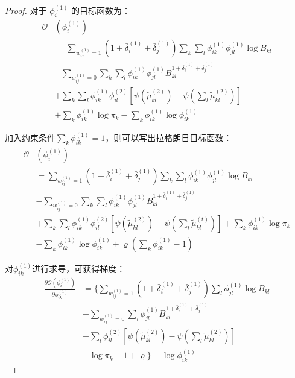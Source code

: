 \begin{proof}
	对于 $\phi_i^{(1)}$ 的目标函数为：
	\begin{equation}
		\begin{split}
			\mathscr{O}&(\phi_i^{(1)})  \\
			& = \sum_{w_{ij}^{(1)}=1} (1+\bar{\delta}_i^{(1)}+\bar{\delta}_j^{(1)}) \sum_k \sum_l \phi_{ik}^{(1)}\phi_{jl}^{(1)} \log B_{kl} \\
			& -\sum_{w_{ij}^{(1)}=0} \sum_k \sum_l \phi_{ik}^{(1)}\phi_{jl}^{(1)}  B_{kl}^{1+\bar{\delta}_i^{(1)}+\bar{\delta}_j^{(1)}}  \\
			& + \sum_k \sum_l \phi_{ik}^{(1)}\phi_{il}^{(2)} [\psi(\tilde{\mu}_{kl}^{(2)}) - \psi(\sum_l \tilde{\mu}_{kl}^{(2)})]  \\
			& + \sum_k \phi_{ik}^{(1)} \log \pi_k   - \sum_k \phi_{ik}^{(1)} \log \phi_{ik}^{(1)}
		\end{split}
	\end{equation}
	
	加入约束条件$\sum_k \phi_{ik}^{(1)} = 1$，则可以写出拉格朗日目标函数：
	\begin{equation}
		\begin{split}
			\mathscr{O}&(\phi_i^{(1)})  \\
			& = \sum_{w_{ij}^{(1)}=1} (1+\bar{\delta}_i^{(1)}+\bar{\delta}_j^{(1)}) \sum_k \sum_l \phi_{ik}^{(1)}\phi_{jl}^{(1)} \log B_{kl} \\
			& -\sum_{w_{ij}^{(1)}=0} \sum_k \sum_l \phi_{ik}^{(1)}\phi_{jl}^{(1)}  B_{kl}^{1+\bar{\delta}_i^{(1)}+\bar{\delta}_j^{(1)}} \\
			& + \sum_k \sum_l \phi_{ik}^{(1)}\phi_{il}^{(2)} [\psi(\tilde{\mu}_{kl}^{(2)}) - \psi(\sum_l \tilde{\mu}_{kl}^{(t)})]   + \sum_k \phi_{ik}^{(1)} \log \pi_k   \\
			& - \sum_k \phi_{ik}^{(1)} \log \phi_{ik}^{(1)}  +\varrho(\sum_k \phi_{ik}^{(1)}-1)
		\end{split}
	\end{equation}
	
	对$\phi_{ik}^{(1)}$进行求导，可获得梯度：
	\begin{equation}
		\begin{split}
			\frac{\partial \mathscr{O}(\phi_i^{(1)})}{\partial \phi_{ik}^{(1)}} & = \{ \sum_{w_{ij}^{(1)}=1} (1+\bar{\delta}_i^{(1)}+\bar{\delta}_j^{(1)}) \sum_l \phi_{jl}^{(1)} \log B_{kl} \\ 
			& -\sum_{w_{ij}^{(1)}=0} \sum_l \phi_{jl}^{(1)}  B_{kl}^{1+\bar{\delta}_i^{(1)}+\bar{\delta}_j^{(1)}} \\
			& + \sum_l \phi_{il}^{(2)} [\psi(\tilde{\mu}_{kl}^{(2)}) - \psi(\sum_l \tilde{\mu}_{kl}^{(2)})]\\
			&+\log \pi_k  -1 +\varrho \} -\log \phi_{ik}^{(1)}
		\end{split}
		\label{appendix:eq:phi1}
	\end{equation}
	

\end{proof}
